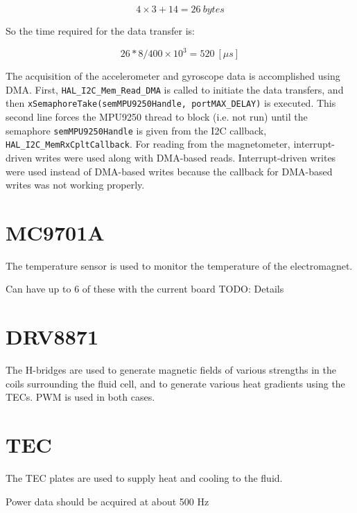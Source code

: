 \documentclass{article}
\begin{document}
\begin{equation}
4 \times 3 + 14 = 26 \ bytes
\end{equation}

So the time required for the data transfer is:

\begin{equation}
26 * 8 / 400 \times 10^3 = 520 \ [\mu s]
\end{equation}

The acquisition of the accelerometer and gyroscope data is accomplished using DMA. First, \texttt{HAL\_I2C\_Mem\_Read\_DMA} is called to initiate the data transfers, and then \texttt{xSemaphoreTake(semMPU9250Handle, portMAX\_DELAY)} is executed. This second line forces the MPU9250 thread to block (i.e. not run) until the semaphore \texttt{semMPU9250Handle} is given from the I2C callback, \texttt{HAL\_I2C\_MemRxCpltCallback}. For reading from the magnetometer, interrupt-driven writes were used along with DMA-based reads. Interrupt-driven writes were used instead of DMA-based writes because the callback for DMA-based writes was not working properly.

\clearpage

%
%
%
%

\section{MC9701A} \label{tempsensor}
The temperature sensor is used to monitor the temperature of the electromagnet.

Can have up to 6 of these with the current board
TODO: Details
\clearpage

%
%
%
%

\section{DRV8871} \label{hbridge}
The H-bridges are used to generate magnetic fields of various strengths in the coils surrounding the fluid cell, and to generate various heat gradients using the TECs. PWM is used in both cases.
\clearpage

%
%
%
%

\section{TEC} \label{18B20}
The TEC plates are used to supply heat and cooling to the fluid.

Power data should be acquired at about 500 Hz
\clearpage
\end{document}

